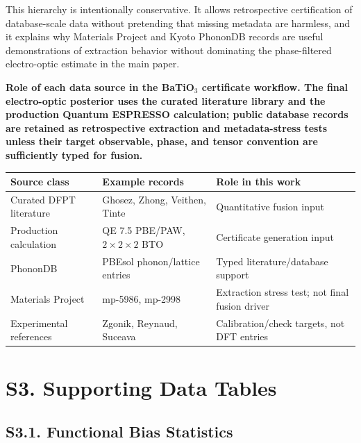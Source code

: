 \documentclass[onecolumn,superscriptaddress,amsmath,amssymb,longbibliography]{revtex4-2}
\begin{document}
This hierarchy is intentionally conservative. It allows retrospective
certification of database-scale data without pretending that missing metadata
are harmless, and it explains why Materials Project and Kyoto PhononDB records
are useful demonstrations of extraction behavior without dominating the
phase-filtered electro-optic estimate in the main paper.

\begin{center}
\textbf{Role of each data source in the BaTiO$_3$ certificate workflow. The
final electro-optic posterior uses the curated literature library and the
production Quantum ESPRESSO calculation; public database records are retained
as retrospective extraction and metadata-stress tests unless their target
observable, phase, and tensor convention are sufficiently typed for fusion.}\\[0.5em]
\begin{tabular}{lll}
\toprule
Source class & Example records & Role in this work \\
\midrule
Curated DFPT literature & Ghosez, Zhong, Veithen, Tinte & Quantitative fusion input \\
Production calculation & QE 7.5 PBE/PAW, $2\times2\times2$ BTO & Certificate generation input \\
PhononDB & PBEsol phonon/lattice entries & Typed literature/database support \\
Materials Project & mp-5986, mp-2998 & Extraction stress test; not final fusion driver \\
Experimental references & Zgonik, Reynaud, Suceava & Calibration/check targets, not DFT entries \\
\bottomrule
\end{tabular}
\end{center}


\section{S3. Supporting Data Tables}
\label{sec:si_tables}

\subsection{S3.1. Functional Bias Statistics}
\end{document}
